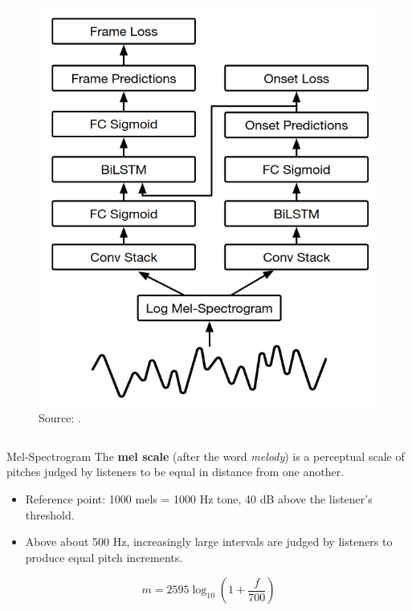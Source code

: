 \documentclass{beamer}
\newcommand{\emp}[1]{\textcolor{tum}{\textbf{#1}}}
\begin{document}
\begin{frame}[allowframebreaks]
\begin{columns}
		\begin{column}{0.6\textwidth}
			\begin{figure}[!ht]
				\centering
				\includegraphics[width=.7\textwidth]{OF.png}
				\caption{Source: \cite{OF}.}
				\label{fig:OF}
			\end{figure}
		\end{column}
	\end{columns}




	\framebreak

	\begin{block}{Mel-Spectrogram}
		The \emp{mel scale} (after the word \textit{melody})
		is a perceptual scale of pitches judged by listeners to be equal in distance from one another.

		\begin{itemize}
			\item Reference point: 1000 mels = 1000 Hz tone, 40 dB above the listener's threshold.
			\item Above about 500 Hz, increasingly large intervals are judged by listeners to produce equal pitch increments.
		\end{itemize}



	\end{block}

	\framebreak

	\begin{equation*}
		m = 2595\log_{10}\left(1+\frac{f}{700}\right)
	\end{equation*}


\end{frame}
\end{document}
